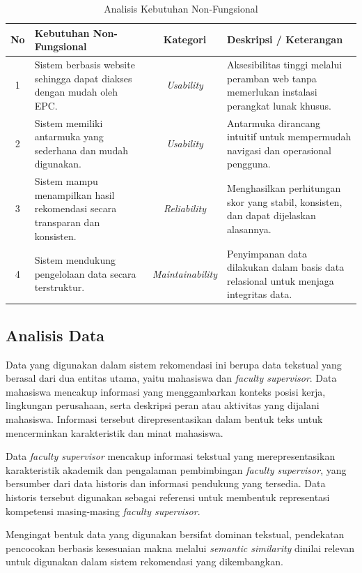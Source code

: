 \begin{table}[htbp]
\centering
\caption{Analisis Kebutuhan Non-Fungsional}
\label{tab:kebutuhan-non-fungsional}
\begin{tabular}{|c|p{4cm}|c|p{5.5cm}|}
\hline
\textbf{No} & \textbf{Kebutuhan Non-Fungsional} & \textbf{Kategori} & \textbf{Deskripsi / Keterangan} \\ \hline
1 & Sistem berbasis website sehingga dapat diakses dengan mudah oleh EPC. & \textit{Usability} & Aksesibilitas tinggi melalui peramban web tanpa memerlukan instalasi perangkat lunak khusus. \\ \hline
2 & Sistem memiliki antarmuka yang sederhana dan mudah digunakan. & \textit{Usability} & Antarmuka dirancang intuitif untuk mempermudah navigasi dan operasional pengguna. \\ \hline
3 & Sistem mampu menampilkan hasil rekomendasi secara transparan dan konsisten. & \textit{Reliability} & Menghasilkan perhitungan skor yang stabil, konsisten, dan dapat dijelaskan alasannya. \\ \hline
4 & Sistem mendukung pengelolaan data secara terstruktur. & \textit{Maintainability} & Penyimpanan data dilakukan dalam basis data relasional untuk menjaga integritas data. \\ \hline
\end{tabular}
\end{table}

\subsection{Analisis Data}\label{analisis-data}

Data yang digunakan dalam sistem rekomendasi ini berupa data tekstual yang berasal dari dua entitas utama, yaitu mahasiswa dan \textit{faculty supervisor}. Data mahasiswa mencakup informasi yang menggambarkan konteks posisi kerja, lingkungan perusahaan, serta deskripsi peran atau aktivitas yang dijalani mahasiswa. Informasi tersebut direpresentasikan dalam bentuk teks untuk mencerminkan karakteristik dan minat mahasiswa.

Data \textit{faculty supervisor} mencakup informasi tekstual yang merepresentasikan karakteristik akademik dan pengalaman pembimbingan \textit{faculty supervisor}, yang bersumber dari data historis dan informasi pendukung yang tersedia. Data historis tersebut digunakan sebagai referensi untuk membentuk representasi kompetensi masing-masing \textit{faculty supervisor}.

Mengingat bentuk data yang digunakan bersifat dominan tekstual, pendekatan pencocokan berbasis kesesuaian makna melalui \textit{semantic similarity} dinilai relevan untuk digunakan dalam sistem rekomendasi yang dikembangkan.

